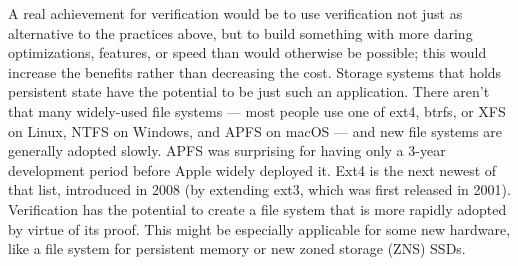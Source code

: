 A real achievement for verification would be to use verification not just as
alternative to the practices above, but to build something with more daring optimizations,
features, or speed than would otherwise be possible; this would increase the
benefits rather than decreasing the cost. Storage systems that holds persistent
state have the potential to be just such an application. There aren't that many
widely-used
file systems --- most people use one of ext4, btrfs, or XFS on Linux, NTFS on
Windows, and APFS on macOS --- and new file systems are generally adopted
slowly. APFS was surprising for having only a 3-year development period before
Apple widely deployed it. Ext4 is the next newest of that list, introduced in
2008 (by extending ext3, which was first released in 2001). Verification has the
potential to create a file system that is more rapidly adopted by virtue of its
proof. This might be especially applicable for some new hardware, like a file
system for persistent memory or new zoned storage (ZNS) SSDs.


%

